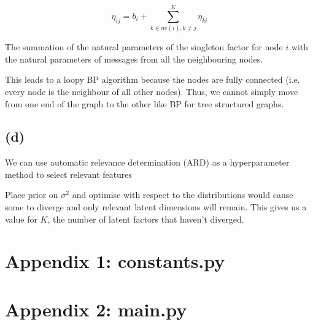 \documentclass[12pt]{article}
\begin{document}
\[\eta_{ij} = b_i + \sum_{k\in ne(i), k\neq j}^{K} \eta_{ki} \]

The summation of the natural parameters of the singleton factor for node $i$ with the natural parameters of messages from all the neighbouring nodes.

This leads to a loopy BP algorithm because the nodes are fully connected (i.e. every node is the neighbour of all other nodes). Thus, we cannot simply move from one end of the graph to the other like BP for tree structured graphs.

\subsection*{(d)}

We can use automatic relevance determination (ARD) as a hyperparameter method to select relevant features

Place prior on $\sigma^2$ and optimise with respect to the distributions would cause some to diverge and only relevant latent dimensions will remain.
This gives us a value for $K$, the number of latent factors that haven't diverged.


\newpage
\section*{Appendix 1: constants.py}

\newpage
\section*{Appendix 2: main.py}

\end{document}
